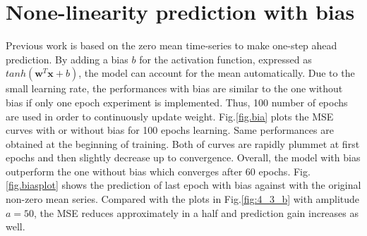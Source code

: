 \section{None-linearity prediction with bias}
Previous work is based on the zero mean time-series to make one-step ahead prediction. By adding a bias $b$ for the activation function, expressed as $tanh(\mathbf{w}^T\mathbf{x}+b)$, the model can account for the mean automatically. Due to the small learning rate, the performances with bias are similar to the one without bias if only one epoch experiment is implemented. Thus, 100 number of epochs are used in order to continuously update weight. Fig.\ref{fig.bia} plots the MSE curves with or without bias for 100 epochs learning. Same performances are obtained at the beginning of training. Both of curves are rapidly plummet at first epochs and then slightly decrease up to convergence. Overall, the model with bias outperform the one without bias which converges after 60 epochs. Fig.\ref{fig.biasplot} shows the prediction of last epoch with bias against with the original non-zero mean series. Compared with the plots in Fig.\ref{fig:4_3_b} with amplitude $a=50$, the MSE reduces approximately in a half and prediction gain increases as well.
